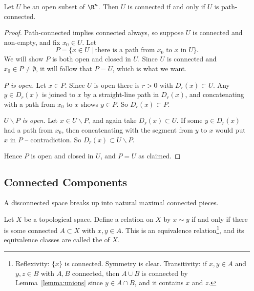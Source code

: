 \begin{theorem}\label{thm:openconn}
    Let $U$ be an open subset of $\R^n$. Then $U$ is connected if and only if $U$ is path-connected.
\end{theorem}
\begin{proof}
    Path-connected implies connected always, so suppose $U$ is connected and non-empty, and fix $x_0 \in U$. Let
    $$
    P = \{x \in U \mid \text{there is a path from } x_0 \text{ to } x \text{ in } U\}.
    $$
    We will show $P$ is both open and closed in $U$. Since $U$ is connected and $x_0 \in P \neq \emptyset$, it will follow that $P = U$, which is what we want.

    \emph{$P$ is open.} Let $x \in P$. Since $U$ is open there is $r > 0$ with $D_r(x) \subset U$. Any $y \in D_r(x)$ is joined to $x$ by a straight-line path in $D_r(x)$, and concatenating with a path from $x_0$ to $x$ shows $y \in P$. So $D_r(x) \subset P$.

    \emph{$U \backslash P$ is open.} Let $x \in U \backslash P$, and again take $D_r(x) \subset U$. If some $y \in D_r(x)$ had a path from $x_0$, then concatenating with the segment from $y$ to $x$ would put $x$ in $P$ -- contradiction. So $D_r(x) \subset U \backslash P$.

    Hence $P$ is open and closed in $U$, and $P = U$ as claimed.
\end{proof}

\subsection{Connected Components}

A disconnected space breaks up into natural maximal connected pieces.

\begin{definition}
    Let $X$ be a topological space. Define a relation on $X$ by $x \sim y$ if and only if there is some connected $A \subset X$ with $x, y \in A$. This is an equivalence relation\footnote{Reflexivity: $\{x\}$ is connected. Symmetry is clear. Transitivity: if $x, y \in A$ and $y, z \in B$ with $A, B$ connected, then $A \cup B$ is connected by Lemma~\ref{lemma:unions} since $y \in A \cap B$, and it contains $x$ and $z$.}, and its equivalence classes are called the  of $X$.
\end{definition}

